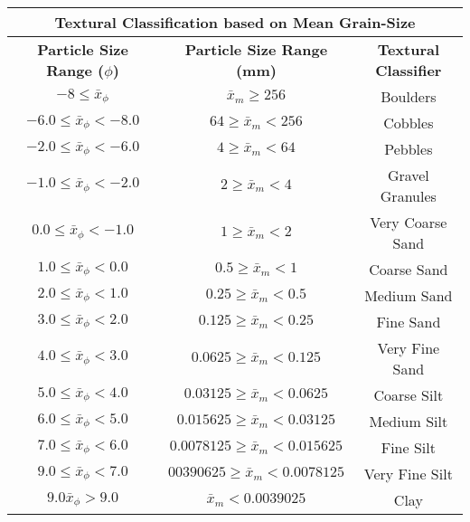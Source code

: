 \documentclass[10pt]{article}
\begin{document}
\begin{center}
\begin{tabular}{ c c c }
\multicolumn{3}{c}{\textbf{Textural Classification based on Mean Grain-Size}} \\
\hline
\textbf{Particle Size Range ($\phi$)} & \textbf{Particle Size Range (mm)} &  \textbf{Textural Classifier} \\
\hline
$-8 \le \bar{x}_\phi $               &  $  \bar{x}_m \ge 256 $         & Boulders  \\ 
$-6.0 \le \bar{x}_\phi < -8.0$   & $64 \ge \bar{x}_m < 256$    & Cobbles  \\  
$-2.0 \le \bar{x}_\phi < -6.0$   & $4 \ge \bar{x}_m < 64$        & Pebbles  \\     
$-1.0 \le \bar{x}_\phi < -2.0$   & $2 \ge \bar{x}_m < 4$        & Gravel Granules  \\   
$0.0 \le \bar{x}_\phi < -1.0$   & $1 \ge \bar{x}_m < 2$        & Very Coarse Sand  \\
$1.0 \le \bar{x}_\phi < 0.0$   & $0.5 \ge \bar{x}_m < 1$        &  Coarse Sand  \\
$2.0 \le \bar{x}_\phi < 1.0$   & $0.25 \ge \bar{x}_m < 0.5$        &  Medium Sand  \\
$3.0 \le \bar{x}_\phi < 2.0$   & $0.125 \ge \bar{x}_m < 0.25$        &  Fine Sand  \\
$4.0 \le \bar{x}_\phi < 3.0$   & $0.0625 \ge \bar{x}_m < 0.125$        &  Very Fine Sand  \\
$5.0 \le \bar{x}_\phi < 4.0$   & $0.03125 \ge \bar{x}_m < 0.0625$        &  Coarse Silt  \\
$6.0 \le \bar{x}_\phi < 5.0$   & $0.015625 \ge \bar{x}_m < 0.03125$        &  Medium Silt  \\
$7.0 \le \bar{x}_\phi < 6.0$   & $0.0078125 \ge \bar{x}_m < 0.015625$        &  Fine Silt  \\
$9.0 \le \bar{x}_\phi < 7.0$   & $00390625 \ge \bar{x}_m < 0.0078125$        &  Very Fine Silt  \\
$9.0 \bar{x}_\phi > 9.0$   & $ \bar{x}_m < 0.0039025$        &  Clay 
\end{tabular}
\end{center}
\end{document}
